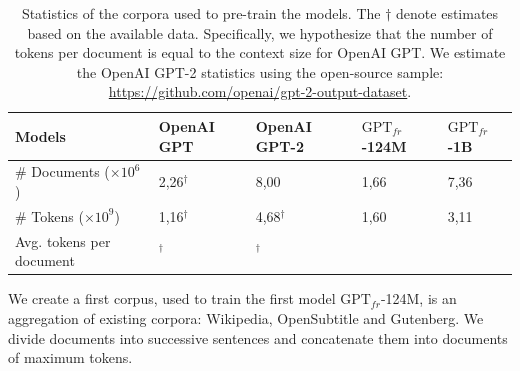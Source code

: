 \begin{table}[!htbp]
\centering
    \begin{tabularx}{\textwidth}{l|YYYY}
    Models & OpenAI GPT &  OpenAI GPT-2 & $\text{GPT}_{fr}$-124M & $\text{GPT}_{fr}$-1B \\\hline
    \# Documents ($\times 10^6$) & 2,26$^\dagger$ & 8,00 & 1,66 & 7,36 \\
    \# Tokens ($\times 10^9$)& 1,16$^\dagger$ & 4,68$^\dagger$ & 1,60 & 3,11\\
    Avg. tokens per document & $^\dagger$ & $^\dagger$ &  & 
    \end{tabularx}
\caption{
 Statistics of the corpora used to pre-train the models. The $\dagger$ denote estimates based on the available data. Specifically, we hypothesize that the number of tokens per document is equal to the context size for OpenAI GPT. We estimate the OpenAI GPT-2 statistics using the open-source sample: \url{https://github.com/openai/gpt-2-output-dataset}.}
\end{table}

We create a first corpus, used to train the first model $\text{GPT}_{fr}$-124M, is an aggregation of existing corpora: Wikipedia, OpenSubtitle \parencite{tiedemann_12} and Gutenberg. We divide documents into successive sentences and concatenate them into documents of maximum  tokens. 

